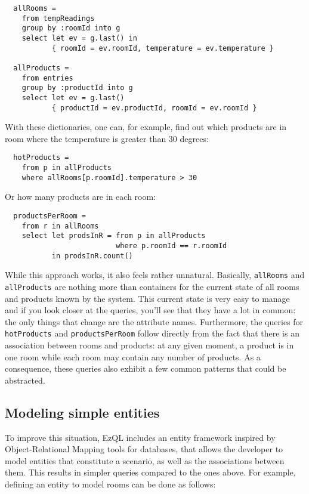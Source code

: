 \documentclass[a4,11pt]{report}
\begin{document}
\begin{lstlisting}
  allRooms =
    from tempReadings
    group by :roomId into g
    select let ev = g.last() in
           { roomId = ev.roomId, temperature = ev.temperature }

  allProducts =
    from entries
    group by :productId into g
    select let ev = g.last()
           { productId = ev.productId, roomId = ev.roomId }
\end{lstlisting}

With these dictionaries, one can, for example, find out which products
are in room where the temperature is greater than 30 degrees:

\begin{lstlisting}
  hotProducts =
    from p in allProducts
    where allRooms[p.roomId].temperature > 30
\end{lstlisting}

Or how many products are in each room:

\begin{lstlisting}
  productsPerRoom =
    from r in allRooms
    select let prodsInR = from p in allProducts
                          where p.roomId == r.roomId
           in prodsInR.count()
\end{lstlisting}

While this approach works, it also feels rather unnatural. Basically,
\verb=allRooms= and \verb=allProducts= are nothing more than
containers for the current state of all rooms and products known by
the system. This current state is very easy to manage and if you look
closer at the queries, you'll see that they have a lot in common: the
only things that change are the attribute names. Furthermore, the
queries for \verb=hotProducts= and \verb=productsPerRoom= follow
directly from the fact that there is an association between rooms and
products: at any given moment, a product is in one room while each
room may contain any number of products. As a consequence, these
queries also exhibit a few common patterns that could be abstracted.

\subsection{Modeling simple entities}

To improve this situation, EzQL includes an entity framework inspired
by Object-Relational Mapping tools for databases, that allows the
developer to model entities that constitute a scenario, as well as the
associations between them. This results in simpler queries compared to
the ones above. For example, defining an entity to model rooms can be
done as follows:
\end{document}
